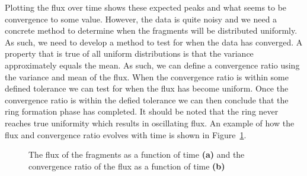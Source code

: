 \documentclass[a4paper, 12pt]{article}
\begin{document}
Plotting the flux over time shows these expected peaks and what seems to be convergence to some value. However, the data is quite noisy and we need a concrete method to determine when the fragments will be distributed uniformly. As such, we need to develop a method to test for when the data has converged. A property that is true of all uniform distributions is that the variance approximately equals the mean. As such, we can define a convergence ratio using the variance and mean of the flux. When the convergence ratio is within some defined tolerance we can test for when the flux has become uniform. Once the convergence ratio is within the defied tolerance  we can then conclude that the ring formation phase has completed. It should be noted that the ring never reaches true uniformity which results in oscillating flux. An example of how the flux and convergence ratio evolves with time is shown in Figure~\ref{flux_plots}.

\begin{figure}[t]
	\begin{adjustbox}{max width=1\linewidth,center}
		\centering     %
	\end{adjustbox}
	\caption{The flux of the fragments as a function of time \textbf{(a)} and the convergence ratio of the flux as a function of time \textbf{(b)} }
	\label{flux_plots}
\end{figure}
\end{document}
